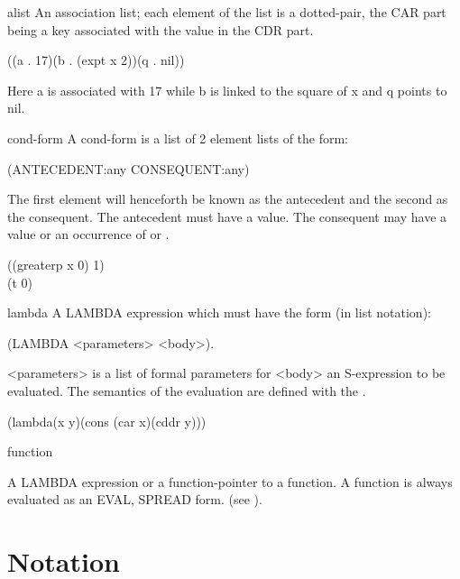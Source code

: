 \begin{Concept}{alist}
An  association   list;   each  element  of   the  list  is   a
     dotted-pair, the CAR part being a key associated  with the value
     in the CDR part.
\begin{Examples}
((a . 17)(b . (expt x 2))(q . nil))\\
\end{Examples}
Here a is associated with 17 while b is linked to the square of x
and q points to nil. 
\end{Concept}

\begin{Concept}{cond-form}
 A cond-form is a list of 2 element lists of the form:

     (ANTECEDENT:any CONSEQUENT:any)

     The  first element will  henceforth be known  as the  antecedent
     and the  second as the consequent.   The antecedent must have  a
     value.   The consequent may have a value or an occurrence of 
      or .
\begin{Examples}
((greaterp x 0) 1)\\
(t 0)\\ 
\end{Examples}
\end{Concept}

\begin{Concept}{lambda}
A  LAMBDA  expression  which  must  have  the  form  (in  list
     notation): 

  (LAMBDA  <parameters>  <body>).  

<parameters>  is  a
     list  of formal parameters  for <body> an  S-expression to  be
     evaluated.   The  semantics of the  evaluation are defined  with
     the  .
\begin{Examples}
  (lambda(x y)(cons (car x)(cddr y))) 
\end{Examples}
\end{Concept}

\begin{Concept}{function}

 A LAMBDA expression or a function-pointer to a function.   A
     function is always evaluated as an EVAL, SPREAD form.
(see ).
\end{Concept}



\section{Notation}

